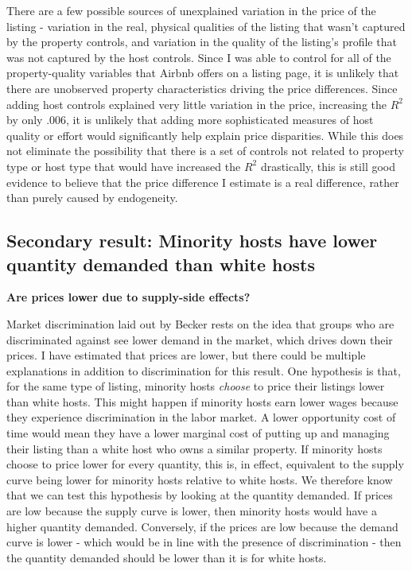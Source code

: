 There are a few possible sources of unexplained variation in the price of the listing - variation in the real, physical qualities of the listing that wasn't captured by the property controls, and variation in the quality of the listing's profile that was not captured by the host controls. Since I was able to control for all of the property-quality variables that Airbnb offers on a listing page, it is unlikely that there are unobserved property characteristics driving the price differences. Since adding host controls explained very little variation in the price, increasing the $R^2$ by only .006, it is unlikely that adding more sophisticated measures of host quality or effort would significantly help explain price disparities. While this does not eliminate the possibility that there is a set of controls not related to property type or host type that would have increased the $R^2$ drastically, this is still good evidence to believe that the price difference I estimate is a real difference, rather than purely caused by endogeneity. 

\subsection{Secondary result: Minority hosts have lower quantity demanded than white hosts}

\textbf{Are prices lower due to supply-side effects?}

Market discrimination laid out by Becker rests on the idea that groups who are discriminated against see lower demand in the market, which drives down their prices. I have estimated that prices are lower, but there could be multiple explanations in addition to discrimination for this result. One hypothesis is that, for the same type of listing, minority hosts \textit{choose} to price their listings lower than white hosts. This might happen if minority hosts earn lower wages because they experience discrimination in the labor market. A lower opportunity cost of time would mean they have a lower marginal cost of putting up and managing their listing than a white host who owns a similar property. If minority hosts choose to price lower for every quantity, this is, in effect, equivalent to the supply curve being lower for minority hosts relative to white hosts. We therefore know that we can test this hypothesis by looking at the quantity demanded. If prices are low because the supply curve is lower, then minority hosts would have a higher quantity demanded. Conversely, if the prices are low because the demand curve is lower - which would be in line with the presence of discrimination - then the quantity demanded should be lower than it is for white hosts. 


